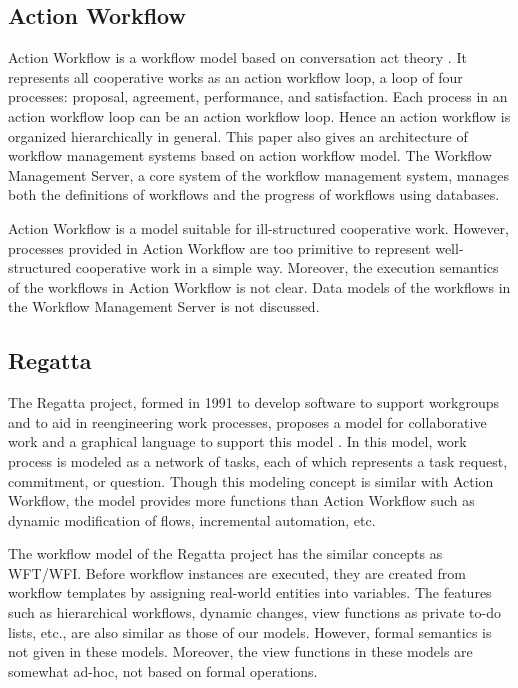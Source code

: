 \subsection{Action Workflow}

Action Workflow \cite{medina-mora:cscw92} is a workflow model based on
conversation act theory \cite{winograd:book86}.  It represents all
cooperative works as an action workflow loop, a loop of four processes:
proposal, agreement, performance, and satisfaction.  Each process in an
action workflow loop can be an action workflow loop.  Hence an action
workflow is organized hierarchically in general.  This paper also gives
an architecture of workflow management systems based on action workflow
model.  The Workflow Management Server, a core system of the workflow
management system, manages both the definitions of workflows and the
progress of workflows using databases.

Action Workflow is a model suitable for ill-structured cooperative work.
However, processes provided in Action Workflow are too primitive to
represent well-structured cooperative work in a simple way.  Moreover,
the execution semantics of the workflows in Action Workflow is not
clear.  Data models of the workflows in the Workflow Management Server
is not discussed.

\subsection{Regatta}

\begin{sloppypar}
 The Regatta project, formed in 1991 to develop software to support
 workgroups and to aid in reengineering work processes, proposes a model
 for collaborative work and a graphical language to support this model 
 \cite{swenson:coocs93}.   In this model, work process is modeled as a
 network of tasks, each of which represents a task request, commitment,
 or question.  Though this modeling concept is similar with Action
 Workflow,  the model provides more functions than Action Workflow such
 as dynamic modification of flows, incremental automation, etc.
\end{sloppypar}

The workflow model of the Regatta project has the similar concepts as
WFT/WFI\@.  Before workflow instances are executed, they are created from
workflow templates by assigning real-world entities into variables.  The
features such as hierarchical workflows, dynamic changes, view functions
as private to-do lists, etc., are also similar as those of our models.
However, formal semantics is not given in these models.  Moreover, the
view functions in these models are somewhat ad-hoc, not based on formal
operations.

